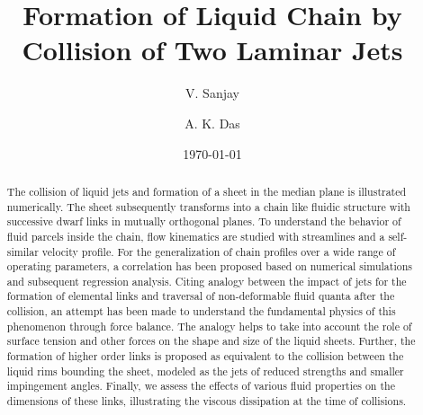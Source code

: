 \documentclass[%
 aip,
 sd,%
amsmath,amssymb,
preprint,%
author-year,%
]{revtex4-1}
\begin{document}
\newcommand{\MarkerCircleRed}{\raisebox{0.5pt}{\tikz{\node[draw,scale=0.4,circle,fill=red!100!red](){};}}}
\newcommand{\MarkerSquareRed}{\raisebox{0.5pt}{\tikz{\node[draw,scale=0.4,regular polygon, regular polygon sides=4,fill=black!20!red](){};}}}
\newcommand{\MarkerDiamondBlack}{\raisebox{0pt}{\tikz{\node[draw,scale=0.4,diamond,fill=black!100!](){};}}}
\newcommand{\MarkerSquareEmpty}{\raisebox{0pt}{\tikz{\node[draw,scale=0.4,regular polygon, regular polygon sides=4](){};}}}
\newcommand{\MarkerCircleEmpty}{\raisebox{0pt}{\tikz{\node[draw,scale=0.4,circle](){};}}}
\title[]{Formation of Liquid Chain by Collision of Two Laminar Jets}
\author{V. Sanjay}
\author{A. K. Das}
%
\date{\today}

\begin{abstract}
The collision of liquid jets and formation of a sheet in the median plane is illustrated numerically. The sheet subsequently transforms into a chain like fluidic structure with successive dwarf links in mutually orthogonal planes. To understand the behavior of fluid parcels inside the chain, flow kinematics are studied with streamlines and a self-similar velocity profile. For the generalization of chain profiles over a wide range of operating parameters, a correlation has been proposed based on numerical simulations and subsequent regression analysis. Citing analogy between the impact of jets for the formation of elemental links and traversal of non-deformable fluid quanta after the collision, an attempt has been made to understand the fundamental physics of this phenomenon through force balance. The analogy helps to take into account the role of surface tension and other forces on the shape and size of the liquid sheets. Further, the formation of higher order links is proposed as equivalent to the collision between the liquid rims bounding the sheet, modeled as the jets of reduced strengths and smaller impingement angles. Finally, we assess the effects of various fluid properties on the dimensions of these links, illustrating the viscous dissipation at the time of collisions.  
\end{abstract}
\maketitle
\end{document}
